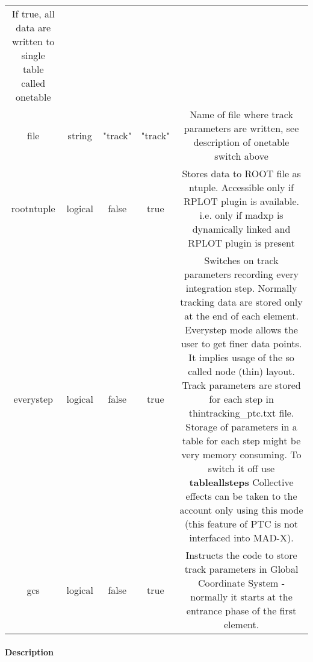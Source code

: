 \begin{tabular}{ccccc}
     If true, all data are written to single table called onetable  \\ 
  file     &   string   &   "track"  &   "track"  &   Name of file where track parameters are written,                                           see description of onetable switch above                                           \\ 
  rootntuple   &   logical      &   false        &    true        &   Stores data to ROOT file as ntuple.                                           Accessible only if RPLOT plugin is available.    i.e. only if madxp is dynamically linked     and RPLOT plugin is present      \\ 
  everystep  &   logical    &     false    &     true     &   Switches on track parameters recording every integration step.                                        Normally tracking data are stored only at the end of each element.                     Everystep mode allows the user to get finer data points.                                        It implies usage of the so called node (thin) layout.                                         Track parameters are stored for each step in thintracking\_ptc.txt file.                                        Storage of parameters in a table for each step might be very memory                      consuming. To switch it off use \textbf{tableallsteps}
     Collective effects can be taken to the account only using this mode                     (this feature of PTC is not interfaced into MAD-X).          \\ 
  gcs   &   logical      &   false        &    true        &   Instructs the code to store track parameters in   Global Coordinate System - normally it starts at the                      entrance phase of the first element.    
\end{tabular}


\paragraph{ Description }

